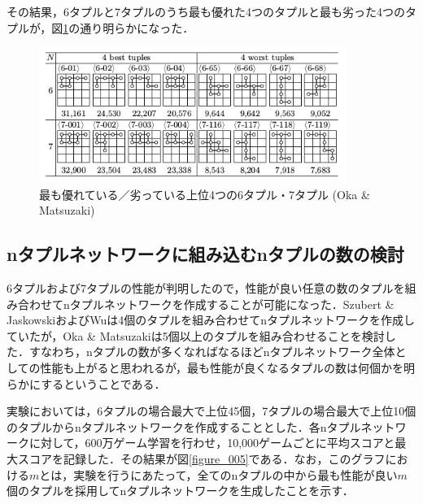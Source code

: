 \documentclass{suribt}
\begin{document}
その結果，6タプルと7タプルのうち最も優れた4つのタプルと最も劣った4つのタプルが，図\ref{figure_004}の通り明らかになった．

\begin{figure}[t]
	\begin{center}
	\includegraphics[width=10cm]{figure_004.png}
	\caption{最も優れている／劣っている上位4つの6タプル・7タプル (Oka \& Matsuzaki)}
	\label{figure_004}
	\end{center}
\end{figure}

\subsection{nタプルネットワークに組み込むnタプルの数の検討}
6タプルおよび7タプルの性能が判明したので，性能が良い任意の数のタプルを組み合わせてnタプルネットワークを作成することが可能になった．Szubert \& JaskowskiおよびWuは4個のタプルを組み合わせてnタプルネットワークを作成していたが，Oka \& Matsuzakiは5個以上のタプルを組み合わせることを検討した．すなわち，nタプルの数が多くなればなるほどnタプルネットワーク全体としての性能も上がると思われるが，最も性能が良くなるタプルの数は何個かを明らかにするということである．

実験においては，6タプルの場合最大で上位45個，7タプルの場合最大で上位10個のタプルからnタプルネットワークを作成することとした．各nタプルネットワークに対して，600万ゲーム学習を行わせ，10,000ゲームごとに平均スコアと最大スコアを記録した．その結果が図\ref{figure_005}である．なお，このグラフにおける$m$とは，実験を行うにあたって，全てのnタプルの中から最も性能が良い$m$個のタプルを採用してnタプルネットワークを生成したことを示す．
\end{document}
